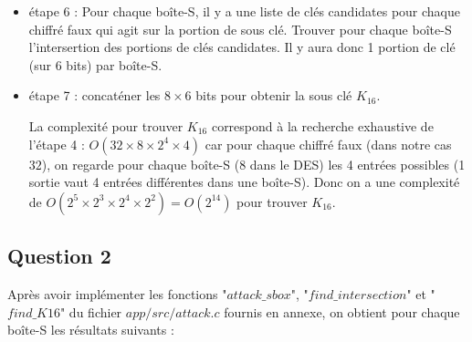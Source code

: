 \documentclass[11pt]{article}
\begin{document}
\begin{itemize}
	\item étape 6 : Pour chaque boîte-S, il y a une liste de clés candidates pour chaque chiffré faux qui agit sur la portion de sous clé. Trouver pour chaque boîte-S l'intersertion des portions de clés candidates. Il y aura donc 1 portion de clé (sur 6 bits) par boîte-S. \newline
	
	\item étape 7 : concaténer les $8 \times 6$ bits pour obtenir la sous clé $K_{16}$. \newline
	
	La complexité pour trouver $K_{16}$ correspond à la recherche exhaustive de l'étape 4 : \newline $O(32 \times 8 \times 2^4 \times 4)$ car pour chaque chiffré faux (dans notre cas $32$), on regarde pour chaque boîte-S ($8$ dans le DES) les 4 entrées possibles (1 sortie vaut 4 entrées différentes dans une boîte-S). \newline Donc on a une complexité de $O(2^5 \times 2^3 \times 2^4 \times 2^2)=O(2^{14})$ pour trouver $K_{16}$. 

\end{itemize}

\subsection{Question 2}

Après avoir implémenter les fonctions "$attack\_sbox$", "$find\_intersection$" et "$find\_K16$" du fichier $app/src/attack.c$ fournis en annexe, on obtient pour chaque boîte-S les résultats suivants : 
\end{document}

